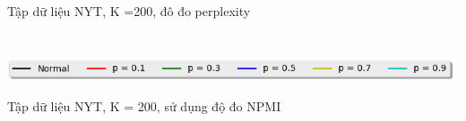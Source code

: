\documentclass[pdf]{beamer}
\begin{document}
\begin{frame}{Tập dữ liệu NYT, K =200, đô đo perplexity}
\begin{columns}[T]
\begin{column}{.50\textwidth}
\begin{figure}
\end{figure}				
\end{column} %
\end{columns}
\begin{center}
\includegraphics[width=1\textwidth]{menu.png}	
\end{center}
\end{frame}

\begin{frame}{Tập dữ liệu NYT, K = 200, sử dụng độ đo NPMI }
\begin{columns}[T] %
\begin{column}{.50\textwidth}
\begin{figure}
\end{figure}
\end{column} %
\hfill%
\begin{column}{.50\textwidth}
\begin{figure}

\end{figure}
\end{column}
\end{columns}
\end{frame}
\end{document}

